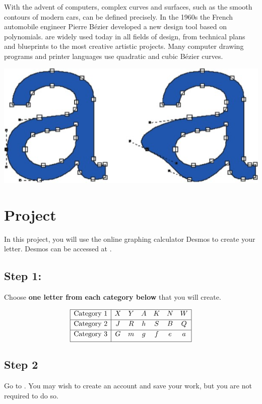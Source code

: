 \documentclass{ximera}
\begin{document}
With the advent of computers, complex curves and surfaces, such as the smooth contours of modern cars, can be defined precisely. In the 1960s the French automobile engineer Pierre Bézier developed a new design tool based on polynomials.  are widely used today in all fields of design, from technical plans and blueprints to the most creative artistic projects. Many computer drawing programs and printer languages use quadratic and cubic Bézier curves.

\begin{image}
\includegraphics[width=\textwidth]{letterA.jpg}
\end{image}

\section{Project}

In this project, you will use the online graphing calculator Desmos to create your letter.  Desmos can be accessed at .  

\subsection{Step 1:} Choose \textbf{one letter from each category below} that you will create.

$$
 \begin{array}{|c | c c c c c c |} 
 \hline
 \text{Category 1} & X & Y & A & K & N & W \\ [0.5ex] 
 \hline
 \text{Category 2} & J & R & h & S & B & Q \\ [0.5ex] 
 \hline
 \text{Category 3} & G & m & g & f & e & a \\[1ex] 
 \hline
\end{array}
$$

\subsection{Step 2} Go to .  You may wish to create an account and save your work, but you are not required to do so.  
\end{document}
